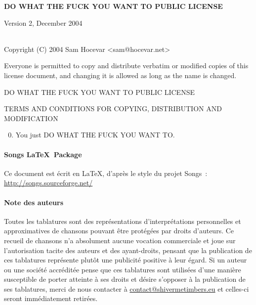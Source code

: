 \begin{center} 
  \textbf{\LARGE{DO WHAT THE FUCK YOU WANT TO PUBLIC LICENSE}}

    Version 2, December 2004

~\\

Copyright (C) 2004 Sam Hocevar <sam@hocevar.net> 
\end{center}
\vspace{1cm}

\begin{lblock}
   Everyone is permitted to copy and distribute verbatim or modified 
 copies of this license document, and changing it is allowed as long 
 as the name is changed. 
\end{lblock}
\begin{lblock}
\centering

DO WHAT THE FUCK YOU WANT TO PUBLIC LICENSE 

TERMS AND CONDITIONS FOR COPYING, DISTRIBUTION AND MODIFICATION

\begin{enumerate}
\setcounter{enumi}{-1}
\item You just DO WHAT THE FUCK YOU WANT TO.
\end{enumerate}
\end{lblock}
\paragraph{Songs \LaTeX~Package}
Ce document est écrit en \LaTeX, d'après le style du projet Songs~:
\url{http://songs.sourceforge.net/}

\paragraph{Note des auteurs}
Toutes les tablatures sont des représentations d'interprétations
personnelles et approximatives de chansons pouvant être protégées par droits
d'auteurs. Ce recueil de chansons n'a absolument aucune vocation
commerciale et joue sur l'autorisation tacite des auteurs et des
ayant-droits, pensant que la publication de ces tablatures représente
plutôt une publicité positive à leur égard. Si un auteur ou une
société accréditée pense que ces tablatures sont utilisées d'une
manière susceptible de porter atteinte à ses droits et désire
s'opposer à la publication de ses tablatures, merci de nous contacter
à \url{contact@shivermetimbers.eu} et celles-ci seront immédiatement
retirées.
